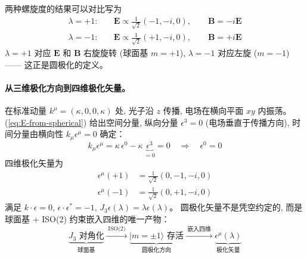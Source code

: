 两种螺旋度的结果可以对比写为
\begin{subequations}\label{eq:E-from-spherical}
\begin{align}
    \lambda=+1: &\quad \boldsymbol{E} \propto \tfrac{1}{\sqrt{2}}(-1,-i,0), 
    \qquad \boldsymbol{B} = -i\boldsymbol{E} \\
    \lambda=-1: &\quad \boldsymbol{E} \propto \tfrac{1}{\sqrt{2}}(+1,-i,0),
    \qquad \boldsymbol{B} = +i\boldsymbol{E}
\end{align}
\end{subequations}
$\lambda=+1$ 对应 $\boldsymbol{E}$ 和 $\boldsymbol{B}$ 右旋旋转 (球面基 $m=+1$), 
$\lambda=-1$ 对应左旋 ($m=-1$)——
这正是圆极化的定义。

\paragraph*{从三维极化方向到四维极化矢量。}
在标准动量 $k^\mu=(\kappa,0,0,\kappa)$ 处, 光子沿 $z$ 传播,
电场在横向平面 $xy$ 内振荡。
(\ref{eq:E-from-spherical}) 给出空间分量, 
纵向分量 $\epsilon^3=0$ (电场垂直于传播方向),
时间分量由横向性 $k_\mu\epsilon^\mu=0$ 确定：
\begin{equation}
    k_\mu\epsilon^\mu = \kappa\,\epsilon^0 - \kappa\,\underbrace{\epsilon^3}_{=0} = 0
    \quad\Longrightarrow\quad \epsilon^0=0
\end{equation}
四维极化矢量为
\begin{subequations}\label{eq:circ-pol}
\begin{align}
    \epsilon^\mu(+1) &= \tfrac{1}{\sqrt{2}}(0,-1,-i,0) \\
    \epsilon^\mu(-1) &= \tfrac{1}{\sqrt{2}}(0,+1,-i,0)
\end{align}
\end{subequations}
满足 $k\cdot\epsilon=0$, $\epsilon\cdot\epsilon^*=-1$,
$J_3\epsilon(\lambda)=\lambda\epsilon(\lambda)$。
圆极化矢量不是凭空约定的, 而是球面基 + ISO(2) 约束嵌入四维的唯一产物：
\begin{equation*}
    \underbrace{J_3\text{ 对角化}}_{\text{球面基}}
    \xrightarrow{\;\text{ISO(2)}\;}
    \underbrace{|m=\pm 1\rangle\text{ 存活}}_{\text{圆极化方向}}
    \xrightarrow{\;\text{嵌入四维}\;}
    \underbrace{\epsilon^\mu(\lambda)}_{\text{极化矢量}}
\end{equation*}


